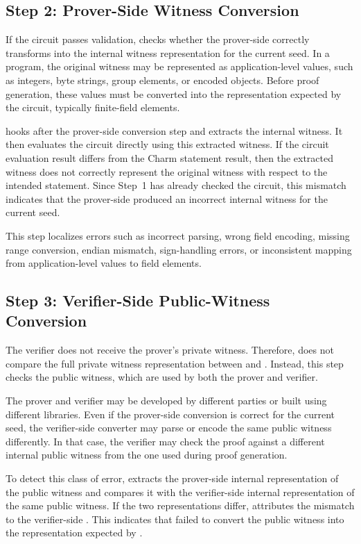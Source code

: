 \subsection{Step 2: Prover-Side Witness Conversion}


If the circuit passes validation, \greyboxfuzz checks whether the prover-side  correctly transforms \witnessorg into the internal witness representation for the current seed. In a \zksnark program, the original witness may be represented as application-level values, such as integers, byte strings, group elements, or encoded objects. Before proof generation, these values must be converted into the representation expected by the circuit, typically finite-field elements.

\greyboxfuzz hooks \pprog after the prover-side conversion step and extracts the internal witness. It then evaluates the circuit directly using this extracted witness. If the circuit evaluation result differs from the Charm statement result, then the extracted witness does not correctly represent the original witness with respect to the intended statement. Since Step~1 has already checked the circuit, this mismatch indicates that the prover-side  produced an incorrect internal witness for the current seed.

This step localizes errors such as incorrect parsing, wrong field encoding, missing range conversion, endian mismatch, sign-handling errors, or inconsistent mapping from application-level values to field elements.

\subsection{Step 3: Verifier-Side Public-Witness Conversion}

The verifier does not receive the prover's private witness. Therefore, \greyboxfuzz does not compare the full private witness representation between \pprog and \vprog. Instead, this step checks the public witness, which are used by both the prover and verifier.

The prover and verifier may be developed by different parties or built using different libraries. Even if the prover-side conversion is correct for the current seed, the verifier-side converter may parse or encode the same public witness differently. In that case, the verifier may check the proof against a different internal public witness from the one used during proof generation.

To detect this class of error, \greyboxfuzz extracts the prover-side internal representation of the public witness and compares it with the verifier-side internal representation of the same public witness. If the two representations differ, \greyboxfuzz attributes the mismatch to the verifier-side . This indicates that \vprog failed to convert the public witness into the representation expected by \vfunc.


